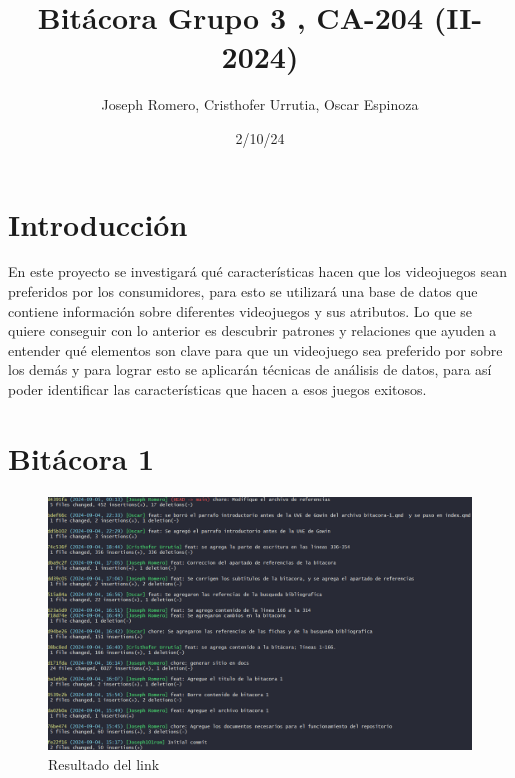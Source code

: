 \documentclass[
  letterpaper,
  DIV=11,
  numbers=noendperiod]{scrreprt}
\title{Bitácora Grupo 3 , CA-204 (II-2024)}
\author{Joseph Romero, Cristhofer Urrutia, Oscar Espinoza}
\date{2/10/24}
\renewcommand*\contentsname{Tabla de contenidos}
\newcommand\contentsname{Tabla de contenidos}
\begin{document}
\maketitle
\ifdefined\Shaded\renewenvironment{Shaded}{\begin{tcolorbox}[breakable, enhanced, frame hidden, interior hidden, sharp corners, borderline west={3pt}{0pt}{shadecolor}, boxrule=0pt]}{\end{tcolorbox}}\fi

\renewcommand*\contentsname{Tabla de contenidos}
{
\hypersetup{linkcolor=}
\setcounter{tocdepth}{2}
\tableofcontents
}

\hypertarget{introducciuxf3n}{%
\chapter*{Introducción}\label{introducciuxf3n}}


En este proyecto se investigará qué características hacen que los
videojuegos sean preferidos por los consumidores, para esto se utilizará
una base de datos que contiene información sobre diferentes videojuegos
y sus atributos. Lo que se quiere conseguir con lo anterior es descubrir
patrones y relaciones que ayuden a entender qué elementos son clave para
que un videojuego sea preferido por sobre los demás y para lograr esto
se aplicarán técnicas de análisis de datos, para así poder identificar
las características que hacen a esos juegos exitosos.


\hypertarget{bituxe1cora-1}{%
\chapter{Bitácora 1}\label{bituxe1cora-1}}

\begin{figure}

{\centering \includegraphics{./imagenes/link-1.png}

}

\caption{Resultado del link}

\end{figure}
\end{document}
